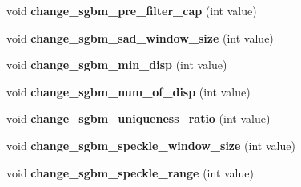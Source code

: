 \begin{DoxyCompactItemize}
\item 
\hypertarget{classstereo__vision_a09335560bab92800a363ff9331eff0b2}{}void {\bfseries change\+\_\+sgbm\+\_\+pre\+\_\+filter\+\_\+cap} (int value)\label{classstereo__vision_a09335560bab92800a363ff9331eff0b2}

\item 
\hypertarget{classstereo__vision_ab46602e71890356be13aaaad67839161}{}void {\bfseries change\+\_\+sgbm\+\_\+sad\+\_\+window\+\_\+size} (int value)\label{classstereo__vision_ab46602e71890356be13aaaad67839161}

\item 
\hypertarget{classstereo__vision_a0e045f3e764dc05a7996eafcaf8aebc6}{}void {\bfseries change\+\_\+sgbm\+\_\+min\+\_\+disp} (int value)\label{classstereo__vision_a0e045f3e764dc05a7996eafcaf8aebc6}

\item 
\hypertarget{classstereo__vision_aefbefa16ef9ddeb42ae10133993df641}{}void {\bfseries change\+\_\+sgbm\+\_\+num\+\_\+of\+\_\+disp} (int value)\label{classstereo__vision_aefbefa16ef9ddeb42ae10133993df641}

\item 
\hypertarget{classstereo__vision_adef75037844513259388033ab8e19e8d}{}void {\bfseries change\+\_\+sgbm\+\_\+uniqueness\+\_\+ratio} (int value)\label{classstereo__vision_adef75037844513259388033ab8e19e8d}

\item 
\hypertarget{classstereo__vision_a504e03ec97c53c7d90a10541351c8d52}{}void {\bfseries change\+\_\+sgbm\+\_\+speckle\+\_\+window\+\_\+size} (int value)\label{classstereo__vision_a504e03ec97c53c7d90a10541351c8d52}

\item 
\hypertarget{classstereo__vision_aa8fc24479b5dd2252de370f9bfd35823}{}void {\bfseries change\+\_\+sgbm\+\_\+speckle\+\_\+range} (int value)\label{classstereo__vision_aa8fc24479b5dd2252de370f9bfd35823}

\end{DoxyCompactItemize}
